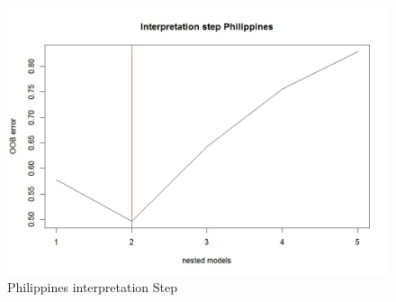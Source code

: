 \documentclass[11pt]{article}
\begin{document}
\FloatBarrier
\begin{figure}[!htb]
\begin{center}
\includegraphics[scale=0.55]{F6.jpg}
\caption{Philippines interpretation Step}
\label{figure17}
\end{center}
\end{figure}
\FloatBarrier
\end{document}
